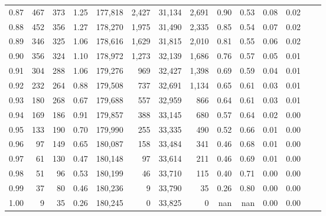 \begin{tabular}{rrrrrrrrrrrrrr}
0.87 &    467 &  373 &    1.25 &  177,818 &    2,427 &  31,134 &   2,691 &  0.90 &  0.53 &  0.08 &      0.02 \\
0.88 &    452 &  356 &    1.27 &  178,270 &    1,975 &  31,490 &   2,335 &  0.85 &  0.54 &  0.07 &      0.02 \\
0.89 &    346 &  325 &    1.06 &  178,616 &    1,629 &  31,815 &   2,010 &  0.81 &  0.55 &  0.06 &      0.02 \\
0.90 &    356 &  324 &    1.10 &  178,972 &    1,273 &  32,139 &   1,686 &  0.76 &  0.57 &  0.05 &      0.01 \\
0.91 &    304 &  288 &    1.06 &  179,276 &      969 &  32,427 &   1,398 &  0.69 &  0.59 &  0.04 &      0.01 \\
0.92 &    232 &  264 &    0.88 &  179,508 &      737 &  32,691 &   1,134 &  0.65 &  0.61 &  0.03 &      0.01 \\
0.93 &    180 &  268 &    0.67 &  179,688 &      557 &  32,959 &     866 &  0.64 &  0.61 &  0.03 &      0.01 \\
0.94 &    169 &  186 &    0.91 &  179,857 &      388 &  33,145 &     680 &  0.57 &  0.64 &  0.02 &      0.00 \\
0.95 &    133 &  190 &    0.70 &  179,990 &      255 &  33,335 &     490 &  0.52 &  0.66 &  0.01 &      0.00 \\
0.96 &     97 &  149 &    0.65 &  180,087 &      158 &  33,484 &     341 &  0.46 &  0.68 &  0.01 &      0.00 \\
0.97 &     61 &  130 &    0.47 &  180,148 &       97 &  33,614 &     211 &  0.46 &  0.69 &  0.01 &      0.00 \\
0.98 &     51 &   96 &    0.53 &  180,199 &       46 &  33,710 &     115 &  0.40 &  0.71 &  0.00 &      0.00 \\
0.99 &     37 &   80 &    0.46 &  180,236 &        9 &  33,790 &      35 &  0.26 &  0.80 &  0.00 &      0.00 \\
1.00 &      9 &   35 &    0.26 &  180,245 &        0 &  33,825 &       0 &   nan &   nan &  0.00 &      0.00 \\
\bottomrule
\end{tabular}
